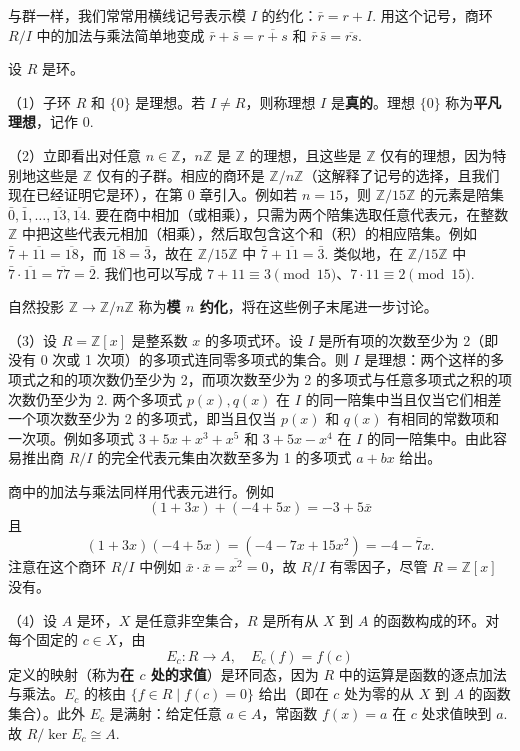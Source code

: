 与群一样，我们常常用横线记号表示模 \(I\) 的约化：\(\bar{r} = r+I\). 用这个记号，商环 \(R/I\) 中的加法与乘法简单地变成 \(\bar{r}+\bar{s} = \overline{r+s}\) 和 \(\bar{r}\,\bar{s} = \overline{rs}\).

\begin{example}
设 \(R\) 是环。

（1）子环 \(R\) 和 \(\{0\}\) 是理想。若 \(I \neq R\)，则称理想 \(I\) 是\textbf{真的}。理想 \(\{0\}\) 称为\textbf{平凡理想}，记作 0.

（2）立即看出对任意 \(n \in \mathbb{Z}\)，\(n\mathbb{Z}\) 是 \(\mathbb{Z}\) 的理想，且这些是 \(\mathbb{Z}\) 仅有的理想，因为特别地这些是 \(\mathbb{Z}\) 仅有的子群。相应的商环是 \(\mathbb{Z}/n\mathbb{Z}\)（这解释了记号的选择，且我们现在已经证明它是环），在第 0 章引入。例如若 \(n = 15\)，则 \(\mathbb{Z}/15\mathbb{Z}\) 的元素是陪集 \(\bar{0}, \bar{1}, \ldots, \overline{13}, \overline{14}\). 要在商中相加（或相乘），只需为两个陪集选取任意代表元，在整数 \(\mathbb{Z}\) 中把这些代表元相加（相乘），然后取包含这个和（积）的相应陪集。例如 \(\bar{7} + \overline{11} = \overline{18}\)，而 \(\overline{18} = \bar{3}\)，故在 \(\mathbb{Z}/15\mathbb{Z}\) 中 \(\bar{7}+\overline{11} = \bar{3}\). 类似地，在 \(\mathbb{Z}/15\mathbb{Z}\) 中 \(\bar{7}\cdot\overline{11} = \overline{77} = \bar{2}\). 我们也可以写成 \(7+11 \equiv 3 \pmod{15}\)、\(7 \cdot 11 \equiv 2 \pmod{15}\).

自然投影 \(\mathbb{Z} \to \mathbb{Z}/n\mathbb{Z}\) 称为\textbf{模 \(n\) 约化}，将在这些例子末尾进一步讨论。

（3）设 \(R = \mathbb{Z}[x]\) 是整系数 \(x\) 的多项式环。设 \(I\) 是所有项的次数至少为 2（即没有 0 次或 1 次项）的多项式连同零多项式的集合。则 \(I\) 是理想：两个这样的多项式之和的项次数仍至少为 2，而项次数至少为 2 的多项式与任意多项式之积的项次数仍至少为 2. 两个多项式 \(p(x), q(x)\) 在 \(I\) 的同一陪集中当且仅当它们相差一个项次数至少为 2 的多项式，即当且仅当 \(p(x)\) 和 \(q(x)\) 有相同的常数项和一次项。例如多项式 \(3+5x+x^3+x^5\) 和 \(3+5x-x^4\) 在 \(I\) 的同一陪集中。由此容易推出商 \(R/I\) 的完全代表元集由次数至多为 1 的多项式 \(a+bx\) 给出。

商中的加法与乘法同样用代表元进行。例如
\[
(1+3x) + (-4+5x) = -3+5\bar{x}
\]
且
\[
(1+3x)(-4+5x) = (-4-7x+15x^2) = -4-\overline{7}x.
\]
注意在这个商环 \(R/I\) 中例如 \(\bar{x}\cdot\bar{x} = \overline{x^2} = 0\)，故 \(R/I\) 有零因子，尽管 \(R = \mathbb{Z}[x]\) 没有。

（4）设 \(A\) 是环，\(X\) 是任意非空集合，\(R\) 是所有从 \(X\) 到 \(A\) 的函数构成的环。对每个固定的 \(c \in X\)，由
\[
E_c : R \to A, \quad E_c(f) = f(c)
\]
定义的映射（称为\textbf{在 \(c\) 处的求值}）是环同态，因为 \(R\) 中的运算是函数的逐点加法与乘法。\(E_c\) 的核由 \(\{f \in R \mid f(c) = 0\}\) 给出（即在 \(c\) 处为零的从 \(X\) 到 \(A\) 的函数集合）。此外 \(E_c\) 是满射：给定任意 \(a \in A\)，常函数 \(f(x) = a\) 在 \(c\) 处求值映到 \(a\). 故 \(R/\ker E_c \cong A\).


\end{example}

